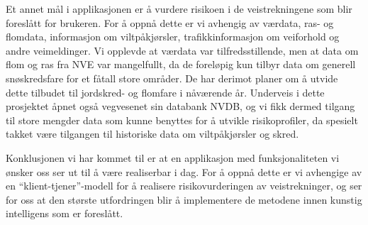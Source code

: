 \documentclass[a4paper,norsk,oneside]{book}
\begin{document}
Et annet mål i applikasjonen er å vurdere risikoen i de veistrekningene som blir foreslått for brukeren. For å oppnå dette er vi avhengig av værdata, ras- og flomdata, informasjon om viltpåkjørsler, trafikkinformasjon om veiforhold og andre veimeldinger. Vi opplevde at værdata var tilfredsstillende, men at data om flom og ras fra NVE var mangelfullt, da de foreløpig kun tilbyr data om generell snøskredsfare for et fåtall store områder. De har derimot planer om å utvide dette tilbudet til jordskred- og flomfare i nåværende år. Underveis i dette prosjektet åpnet også vegvesenet sin databank NVDB, og vi fikk dermed tilgang til store mengder data som kunne benyttes for å utvikle risikoprofiler, da spesielt takket være tilgangen til historiske data om viltpåkjørsler og skred.

Konklusjonen vi har kommet til er at en applikasjon med funksjonaliteten vi ønsker oss ser ut til å være realiserbar i dag. For å oppnå dette er vi avhengige av en “klient-tjener”-modell for å realisere risikovurderingen av veistrekninger, og ser for oss at den største utfordringen blir å implementere de metodene innen kunstig intelligens som er foreslått.



\backmatter




%
\end{document}
